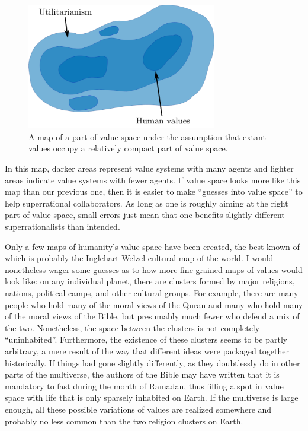 \begin{figure}[h!]
    \centering
    \includegraphics[width=3.26772in]{figs/map-of-value-space-compact}
    \caption{A map of a part of value space under the assumption that extant values occupy a
    relatively compact part of value space.}
    \label{map-of-value-space-compact}
\end{figure}

In this map, darker areas represent value systems with many agents and
lighter areas indicate value systems with fewer agents. If value space
looks more like this map than our previous one, then it is easier to
make ``guesses into value space'' to help superrational collaborators.
As long as one is roughly aiming at the right part of value space, small
errors just mean that one benefits slightly different superrationalists
than intended.

Only a few maps of humanity's value space have been created, the
best-known of which is probably the
\href{https://en.wikipedia.org/wiki/Inglehart\%E2\%80\%93Welzel_cultural_map_of_the_world}{Inglehart-Welzel
cultural map of the world}. I would nonetheless wager some guesses as
to how more fine-grained maps of values would look like: on any
individual planet, there are clusters formed by major religions,
nations, political camps, and other cultural groups. For example, there
are many people who hold many of the moral views of the Quran and many
who hold many of the moral views of the Bible, but presumably much fewer
who defend a mix of the two. Nonetheless, the space between the clusters
is not completely ``uninhabited''. Furthermore, the existence of these
clusters seems to be partly arbitrary, a mere result of the way that
different ideas were packaged together historically.
\href{https://en.wikipedia.org/wiki/Path_dependence}{If things had
gone slightly differently}, as they doubtlessly do in other parts of
the multiverse, the authors of the Bible may have written that it is
mandatory to fast during the month of Ramadan, thus filling a spot in
value space with life that is only sparsely inhabited on Earth. If the
multiverse is large enough, all these possible variations of values are
realized somewhere and probably no less common than the two religion
clusters on Earth.

